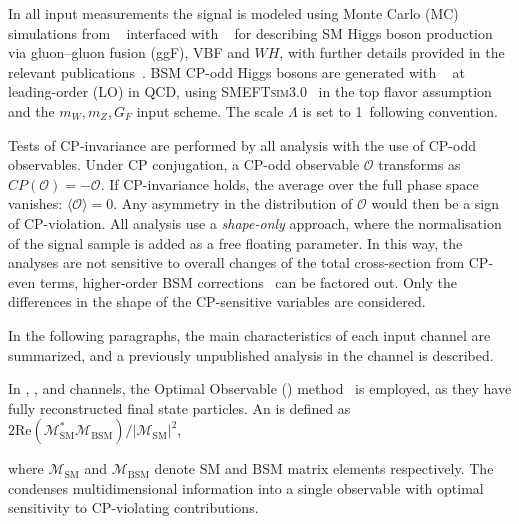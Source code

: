 \documentclass[PAPER, atlasdraft=false, cernpreprint,UKenglish, texmf, orcidlogo]{atlasdoc}
\begin{document}
In all input measurements the signal is modeled using Monte Carlo (MC) simulations from \POWHEGBOX[v2]~\cite{Hamilton:2013fea,Hamilton:2015nsa,Alioli:2010xd,Nason:2004rx,Frixione:2007vw,Nason:2009ai} interfaced with \PYTHIA[8]~\cite{Sjostrand:2014zea} for describing SM Higgs boson production via gluon--gluon fusion (ggF), VBF and $WH$, with further details provided in the relevant publications~\cite{HIGG-2020-08,HIGP-2024-09,HIGP-2024-07,HIGG-2018-30}.
BSM CP-odd Higgs bosons are generated with \MADGRAPH~\cite{Alwall:2014hca} at leading-order (LO) in QCD, using \textsc{SMEFTsim3.0}~\cite{Brivio:2017btx, SMEFTsim} in the top flavor assumption and the ${m_W,m_Z,G_F}$ input scheme. The scale $\Lambda$ is set to 1~\TeV following convention.












Tests of CP-invariance are performed by all analysis with the use of CP-odd observables.  Under CP conjugation, a CP-odd observable $\mathcal{O}$ transforms as $CP(\mathcal{O})=-\mathcal{O} $. If CP-invariance holds, the average over the full phase space vanishes: $\langle \mathcal{O} \rangle = 0$. Any asymmetry in the distribution of $\mathcal{O} $ would then be a sign of CP-violation.  All analysis use a \textit{shape-only} approach, where the normalisation of the signal sample is added as a free floating parameter. In this way, the analyses are not sensitive to overall changes of the total cross-section from CP-even terms, higher-order BSM corrections~\cite{Degrande:2016dqg} can be factored out. Only the differences in the shape of the CP-sensitive variables are considered.



In the following paragraphs, the main characteristics of each input channel are summarized, and a previously unpublished analysis in the \WHbb channel is described.



In \HGam, \Htautau, and \HZZ channels, the Optimal Observable (\OO) method~\cite{Atwood:1991ka,Davier:1992nw,Diehl:1996wm} is employed, as they have fully reconstructed final state particles. An \OO is defined as $2\text{Re}(\mathcal{M}_\text{SM}^{*}\mathcal{M}_\text{BSM})/|\mathcal{M}_\text{SM}|^2$,



where $\mathcal{M}_\text{SM}$ and $\mathcal{M}_\text{BSM}$ denote SM and BSM matrix elements respectively.
The \OO condenses multidimensional information into a single observable with optimal sensitivity to CP-violating contributions.
\end{document}

